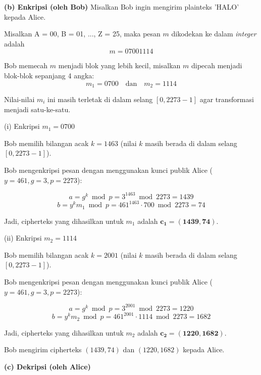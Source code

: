 \documentclass{article}
\begin{document}
\begin{enumerate}
\newpage


\textbf{(b) Enkripsi (oleh Bob)}\newline
Misalkan Bob ingin mengirim plainteks 'HALO' kepada Alice.

Misalkan A = 00, B = 01, ..., Z = 25, maka pesan $m$ dikodekan ke dalam \textit{integer} adalah
\[ m = 07001114 \]

Bob memecah $m$ menjadi blok yang lebih kecil, misalkan $m$ dipecah menjadi blok-blok sepanjang 4 angka:
\[ m_1 = 0700 \quad \text{dan} \quad m_2 = 1114 \]

Nilai-nilai $m_i$ ini masih terletak di dalam selang $[0, 2273 - 1]$ agar transformasi menjadi satu-ke-satu.

\newpage


(i) Enkripsi $m_1 = 0700$

Bob memilih bilangan acak $k = 1463$ (nilai $k$ masih berada di dalam selang $[0, 2273 - 1]$).

Bob mengenkripsi pesan dengan menggunakan kunci publik Alice ($y = 461, g = 3, p = 2273$):

\[ a = g^k \bmod p = 3^{1463} \bmod 2273 = 1439 \]
\[ b = y^k m_1 \bmod p = 461^{1463} \cdot 700 \bmod 2273 = 74 \]

Jadi, cipherteks yang dihasilkan untuk $m_1$ adalah $\mathbf{c_1 = (1439, 74)}$.

\vspace{10mm}

(ii) Enkripsi $m_2 = 1114$

Bob memilih bilangan acak $k = 2001$ (nilai $k$ masih berada di dalam selang $[0, 2273 - 1]$).

Bob mengenkripsi pesan dengan menggunakan kunci publik Alice ($y = 461, g = 3, p = 2273$):

\[ a = g^k \bmod p = 3^{2001} \bmod 2273 = 1220 \]
\[ b = y^k m_2 \bmod p = 461^{2001} \cdot 1114 \bmod 2273 = 1682 \]

Jadi, cipherteks yang dihasilkan untuk $m_2$ adalah $\mathbf{c_2 = (1220, 1682)}$.

Bob mengirim cipherteks $(1439, 74)$ dan $(1220, 1682)$ kepada Alice.

\newpage


\textbf{(c) Dekripsi (oleh Alice)}


\end{enumerate}
\end{document}
